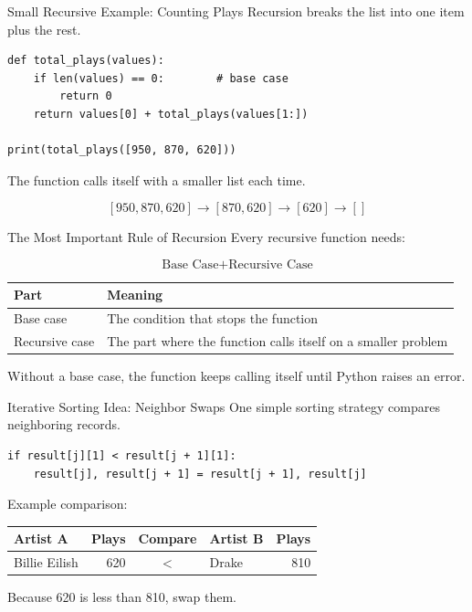 \documentclass[11pt,aspectratio=43]{beamer}
\begin{document}
\begin{frame}[fragile]{Small Recursive Example: Counting Plays}
  Recursion breaks the list into one item plus the rest.

  \begin{lstlisting}
def total_plays(values):
    if len(values) == 0:        # base case
        return 0
    return values[0] + total_plays(values[1:])

print(total_plays([950, 870, 620]))
  \end{lstlisting}

  \vspace{0.3cm}
  The function calls itself with a smaller list each time.

  \[
    [950,870,620] \rightarrow [870,620] \rightarrow [620] \rightarrow []
  \]
\end{frame}

\begin{frame}{The Most Important Rule of Recursion}
  Every recursive function needs:

  \[
    \boxed{\text{Base Case} + \text{Recursive Case}}
  \]

  \begin{center}
    \begin{tabular}{p{} p{}}
      \toprule
      Part & Meaning \\
      \midrule
      Base case & The condition that stops the function \\
      Recursive case & The part where the function calls itself on a smaller problem \\
      \bottomrule
    \end{tabular}
  \end{center}

  Without a base case, the function keeps calling itself until Python raises an error.
\end{frame}

\begin{frame}[fragile]{Iterative Sorting Idea: Neighbor Swaps}
  One simple sorting strategy compares neighboring records.

  \begin{lstlisting}
if result[j][1] < result[j + 1][1]:
    result[j], result[j + 1] = result[j + 1], result[j]
  \end{lstlisting}

  \vspace{0.3cm}
  Example comparison:

  \begin{center}
    \begin{tabular}{l r c l r}
      \toprule
      Artist A & Plays & Compare & Artist B & Plays \\
      \midrule
      Billie Eilish & 620 & $<$ & Drake & 810 \\
      \bottomrule
    \end{tabular}
  \end{center}

  Because 620 is less than 810, swap them.
\end{frame}
\end{document}
